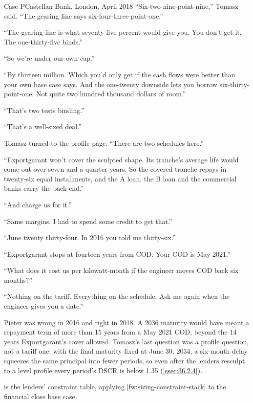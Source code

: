 \begin{casescene}{Case P}{Castellan Bank, London, April 2018}
``Six-two-nine-point-nine,'' Tomasz said. ``The gearing line says six-four-three-point-one.''

``The gearing line is what seventy-five percent would give you. You don't get it. The one-thirty-five binds.''

``So we're under our own cap.''

``By thirteen million. Which you'd only get if the cash flows were better than your own base case says. And the one-twenty downside lets you borrow six-thirty-point-one. Not quite two hundred thousand dollars of room.''

``That's two tests binding.''

``That's a well-sized deal.''

Tomasz turned to the profile page. ``There are two schedules here.''

``Exportgarant won't cover the sculpted shape. Its tranche's average life would come out over seven and a quarter years. So the covered tranche repays in twenty-six equal installments, and the A loan, the B loan and the commercial banks carry the back end.''

``And charge us for it.''

``Same margins. I had to spend some credit to get that.''

``June twenty thirty-four. In 2016 you told me thirty-six.''

``Exportgarant stops at fourteen years from COD. Your COD is May 2021.''

``What does it cost us per kilowatt-month if the engineer moves COD back six months?''

``Nothing on the tariff. Everything on the schedule. Ask me again when the engineer gives you a date.''
\end{casescene}

Pieter was wrong in 2016 and right in 2018. A 2036 maturity would have meant a repayment term of more than 15 years from a May 2021 COD, beyond the 14 years Exportgarant's cover allowed. Tomasz's last question was a profile question, not a tariff one: with the final maturity fixed at June 30, 2034, a six-month delay squeezes the same principal into fewer periods, so even after the lenders resculpt to a level profile every period's DSCR is below 1.35\x{} (\cref{ssec:36.2.4}).

 is the lenders' constraint table, applying \cref{fw:sizing-constraint-stack} to the financial close base case.

